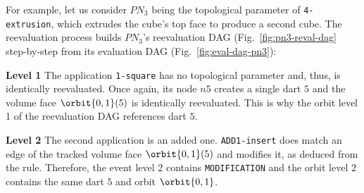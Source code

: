 For example, let us consider $PN_{3}$ being the topological parameter of \texttt{4-extrusion}, which extrudes the cube's top face 
to produce %
a second cube. %
The reevaluation process builds $PN_{3}$'s reevaluation DAG (Fig.~\ref{fig:pn3-reval-dag} step-by-step from its evaluation DAG (Fig.~\ref{fig:eval-dag-pn3}):

\textbf{Level 1} The application \texttt{1-square} has no topological parameter
and, thus, is identically reevaluated. Once again, its node $n5$ creates a
single dart $5$ and the volume face $\orbit{0,1}(5)$ is identically reevaluated.
This is why the orbit level 1 of the reevaluation DAG references dart $5$.

\textbf{Level 2} The second application is an added one. \texttt{ADD1-insert}
does match an edge of the tracked volume face $\orbit{0,1}(5)$ and modifies it,
as deduced from the rule. Therefore, the event level 2 contains
\texttt{MODIFICATION} and the orbit level 2 contains the same dart $5$ and orbit
$\orbit{0,1}$.

